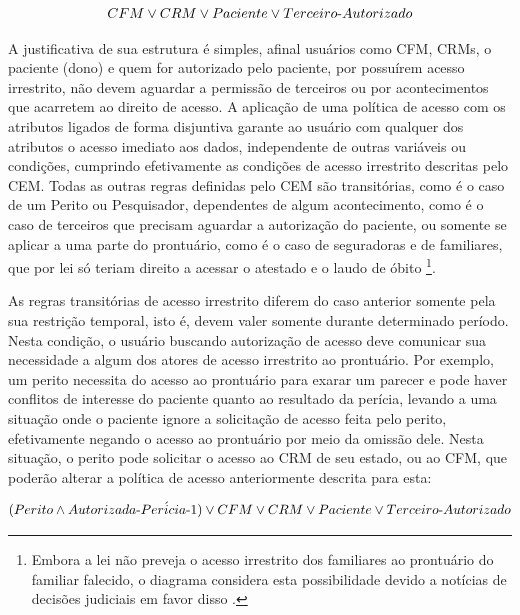 \documentclass[a4paper,11pt]{article}
\begin{document}
\[ CFM \vee CRM \vee Paciente \vee Terceiro\textnormal{-}Autorizado \]

A justificativa de sua estrutura é simples, afinal usuários como CFM, CRMs, o paciente (dono) e quem for autorizado pelo paciente, por possuírem acesso irrestrito, não devem aguardar a permissão de terceiros ou por acontecimentos que acarretem ao direito de acesso.
A aplicação de uma política de acesso com os atributos ligados de forma disjuntiva garante ao usuário com qualquer dos atributos o acesso imediato aos dados, independente de outras variáveis ou condições, cumprindo efetivamente as condições de acesso irrestrito descritas pelo CEM.
Todas as outras regras definidas pelo CEM são transitórias, como é o caso de um Perito ou Pesquisador, dependentes de algum acontecimento, como é o caso de terceiros que precisam aguardar a autorização do paciente, ou somente se aplicar a uma parte do prontuário, como é o caso de seguradoras e de familiares, que por lei só teriam direito a acessar o atestado e o laudo de óbito
\footnote{Embora a lei não preveja o acesso irrestrito dos familiares ao prontuário do familiar falecido, o diagrama considera esta possibilidade devido a notícias de decisões judiciais em favor disso \cite{G1SE2013}.}.

As regras transitórias de acesso irrestrito diferem do caso anterior somente pela sua restrição temporal, isto é, devem valer somente durante determinado período.
Nesta condição, o usuário buscando autorização de acesso deve comunicar sua necessidade a algum dos atores de acesso irrestrito ao prontuário.
Por exemplo, um perito necessita do acesso ao prontuário para exarar um parecer e pode haver conflitos de interesse do paciente quanto ao resultado da perícia, levando a uma situação onde o paciente ignore a solicitação de acesso feita pelo perito, efetivamente negando o acesso ao prontuário por meio da omissão dele.
Nesta situação, o perito pode solicitar o acesso ao CRM de seu estado, ou ao CFM, que poderão alterar a política de acesso anteriormente descrita para esta:

\[ (Perito \wedge Autorizada\textnormal{-}Per\acute{i}cia\textnormal{-}1) \vee CFM \vee CRM \vee Paciente \vee Terceiro\textnormal{-}Autorizado \]
\end{document}

